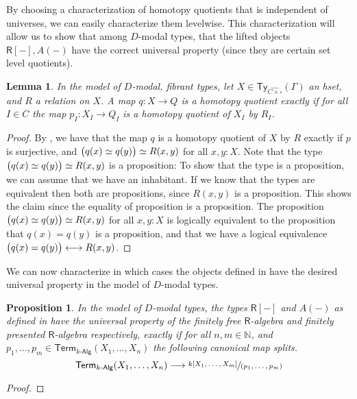 \documentclass[10pt,a4paper]{article}
\newtheorem{lemma}{Lemma}[section]
\newtheorem{proposition}{Proposition}[section]
\newcommand{\nats}{\mathbb{N}}
\newcommand{\Alg}{\mathsf{Alg}}
\newcommand\Ty{\mathsf{Ty}}
\DeclarePairedDelimiter\paren{(}{)}
\newcommand\R{\mathsf{R}}
\newcommand\Term{\mathsf{Term}}
\begin{document}
By choosing a characterization of homotopy quotients that is independent of universes, we can easily characterize them levelwise.
This characterization will allow us to show that among $D$-modal types, that the lifted objects $\R[-], A(-)$ have the correct universal property (since they are certain set level quotients).

\begin{lemma}
  In the model of $D$-modal, fibrant types, let $X \in \Ty_{\widehat{C \times \square}}(\Gamma)$ an hset, and $R$ a relation on $X$.
  A map $q \colon X \to Q$ is a homotopy quotient exactly if for all $I \in C$ the map $p_I \colon X_I \to Q_I$ is a homotopy quotient of $X_I$ by $R_I$.
\end{lemma}
\begin{proof}
  By \cite[Theorem 18.2.3]{rijke2025intro}, we have that the map $q$ is a homotopy quotient of $X$ by $R$ exactly if $p$ is surjective, and $\paren[\big]{q(x) \simeq q(y)} \simeq R(x, y)$ for all $x, y \colon X$.
  Note that the type $\paren[\big]{q(x) \simeq q(y)} \simeq R(x, y)$ is a proposition:
  To show that the type is a proposition, we can assume that we have an inhabitant.
  If we know that the types are equivalent then both are propositions, since $R(x, y)$ is a proposition.
  This shows the claim since the equality of proposition is a proposition.
  The proposition $\paren[\big]{q(x) \simeq q(y)} \simeq R(x, y)$ for all $x, y \colon X$ is logically equivalent to the proposition that $q(x) = q(y)$ is a proposition, and that we have a logical equivalence $\paren[\big]{q(x) = q(y)} \longleftrightarrow R(x,y)$.
  
  
\end{proof}


We can now characterize in which cases the objects defined in  have the desired universal property in the model of $D$-modal types.

\begin{proposition}
  In the model of $D$-modal types, the types $\R[-]$ and $A(-)$ as defined in  have the universal property of the finitely free $\R$-algebra and finitely presented $\R$-algebra respectively, exactly if for all $n, m\in \nats$, and $p_1, \ldots, p_m \in \Term_{k\text{-}\Alg}(X_1, \ldots, X_n)$ the following canonical map splits.
  \[
    \Term_{k\text{-}\Alg}(X_1, \ldots, X_n) \longrightarrow \sfrac{k[X_1, \ldots, X_m]}{(p_1, \ldots, p_m)}
  \]
\end{proposition}
\begin{proof}
\end{proof}
\end{document}
